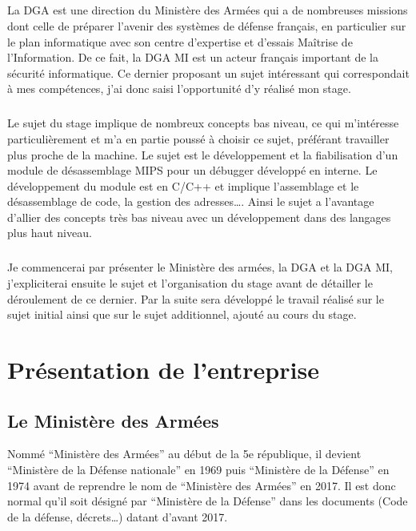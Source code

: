 \documentclass[11pt, book, english, french, standardlists]{upmethodology-document}
\begin{document}
		\paragraph*{}
			La \gls{DGA} est une direction du Ministère des Armées qui a de nombreuses missions dont celle de préparer l’avenir des systèmes de défense français, en particulier sur le plan informatique avec son centre d’expertise et d’essais Maîtrise de l'Information. De ce fait, la \gls{DGA MI} est un acteur français important de la sécurité informatique. Ce dernier proposant un sujet intéressant qui correspondait à mes compétences, j'ai donc saisi l'opportunité d'y réalisé mon stage.
		\paragraph*{}
			Le sujet du stage implique de nombreux concepts bas niveau, ce qui m'intéresse particulièrement et m'a en partie poussé à choisir ce sujet, préférant travailler plus proche de la machine.  Le sujet est le développement et la fiabilisation d'un module de désassemblage \acrshort{MIPS} pour un débugger développé en interne. Le développement du module est en C/C++ et implique l'assemblage et le désassemblage de code, la gestion des adresses\ldots. Ainsi le sujet a l'avantage d'allier des concepts très bas niveau avec un développement dans des langages plus haut niveau.
		\paragraph*{}
			Je commencerai par présenter le Ministère des armées, la \gls{DGA} et la \gls{DGA MI}, j'expliciterai ensuite le sujet et l'organisation du stage avant de détailler le déroulement de ce dernier. Par la suite sera développé le travail réalisé sur le sujet initial ainsi que sur le sujet additionnel, ajouté au cours du stage.
	\chapter{Présentation de l'entreprise}
		\section{Le Ministère des Armées}
			\begin{upminfo}
				Nommé ``Ministère des Armées'' au début de la 5e république, il devient ``Ministère de la Défense nationale'' en 1969 puis ``Ministère de la Défense'' en 1974 avant de reprendre le nom de ``Ministère des Armées'' en 2017. Il est donc normal qu'il soit désigné par ``Ministère de la Défense'' dans les documents (Code de la défense, décrets\ldots) datant d'avant 2017.
			\end{upminfo}
\end{document}
